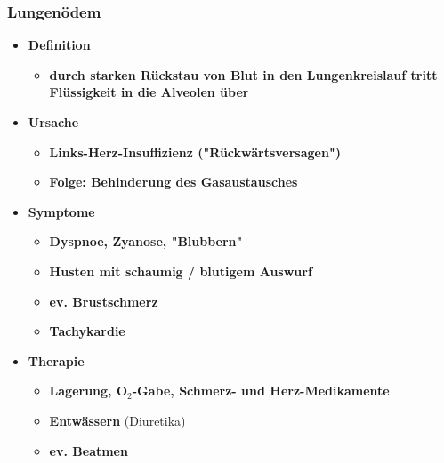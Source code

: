 	\subsubsection{Lungenödem}
		\begin{itemize}
			\item \textbf{Definition}
					\begin{itemize}
						\item \textbf{durch starken Rückstau von Blut in den Lungenkreislauf tritt Flüssigkeit in die Alveolen über}
					\end{itemize}
			\item \textbf{Ursache}
					\begin{itemize}
						\item \textbf{Links-Herz-Insuffizienz ("Rückwärtsversagen")}
						\item \textbf{Folge: Behinderung des Gasaustausches}
					\end{itemize}
			\item \textbf{Symptome}
					\begin{itemize}
						\item \textbf{Dyspnoe, Zyanose, "Blubbern"}
						\item \textbf{Husten mit schaumig / blutigem Auswurf}
						\item \textbf{ev. Brustschmerz}
						\item \textbf{Tachykardie}
					\end{itemize}
			\item \textbf{Therapie}
					\begin{itemize}
						\item \textbf{Lagerung, O$_2$-Gabe, Schmerz- und Herz-Medikamente}
						\item \textbf{Entwässern} (Diuretika)
						\item \textbf{ev. Beatmen}
					\end{itemize}
		\end{itemize}